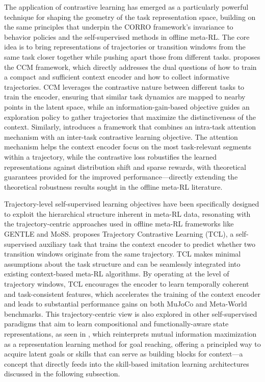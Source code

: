 \documentclass[11pt]{article}
\begin{document}
The application of contrastive learning has emerged as a particularly powerful technique for shaping the geometry of the task representation space, building on the same principles that underpin the CORRO framework's invariance to behavior policies and the self-supervised methods in offline meta-RL. The core idea is to bring representations of trajectories or transition windows from the same task closer together while pushing apart those from different tasks. \cite{ref310} proposes the CCM framework, which directly addresses the dual questions of how to train a compact and sufficient context encoder and how to collect informative trajectories. CCM leverages the contrastive nature between different tasks to train the encoder, ensuring that similar task dynamics are mapped to nearby points in the latent space, while an information-gain-based objective guides an exploration policy to gather trajectories that maximize the distinctiveness of the context. Similarly, \cite{ref339} introduces a framework that combines an intra-task attention mechanism with an inter-task contrastive learning objective. The attention mechanism helps the context encoder focus on the most task-relevant segments within a trajectory, while the contrastive loss robustifies the learned representations against distribution shift and sparse rewards, with theoretical guarantees provided for the improved performance---directly extending the theoretical robustness results sought in the offline meta-RL literature.

Trajectory-level self-supervised learning objectives have been specifically designed to exploit the hierarchical structure inherent in meta-RL data, resonating with the trajectory-centric approaches used in offline meta-RL frameworks like GENTLE and MoSS. \cite{ref318} proposes Trajectory Contrastive Learning (TCL), a self-supervised auxiliary task that trains the context encoder to predict whether two transition windows originate from the same trajectory. TCL makes minimal assumptions about the task structure and can be seamlessly integrated into existing context-based meta-RL algorithms. By operating at the level of trajectory windows, TCL encourages the encoder to learn temporally coherent and task-consistent features, which accelerates the training of the context encoder and leads to substantial performance gains on both MuJoCo and Meta-World benchmarks. This trajectory-centric view is also explored in other self-supervised paradigms that aim to learn compositional and functionally-aware state representations, as seen in \cite{ref345}, which reinterprets mutual information maximization as a representation learning method for goal reaching, offering a principled way to acquire latent goals or skills that can serve as building blocks for context---a concept that directly feeds into the skill-based imitation learning architectures discussed in the following subsection.
\end{document}
